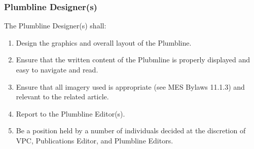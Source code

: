 
\subsubsection{Plumbline Designer(s)}
\label{plumbline-designers} 
The Plumbline Designer(s) shall: 

\begin{enumerate} 
  \item 
   Design the graphics and overall layout of the Plumbline. 
  \item    
   Ensure that the written content of the Plubmline is properly displayed and easy to navigate and read. 
  \item     
   Ensure that all imagery used is appropriate (see MES Bylaws 11.1.3) and relevant to the related article. 
  \item     
   Report to the Plumbline Editor(s). 
  \item     
   Be a position held by a number of individuals decided at the discretion of VPC, Publications Editor, and Plumbline Editors. 

\end{enumerate} 